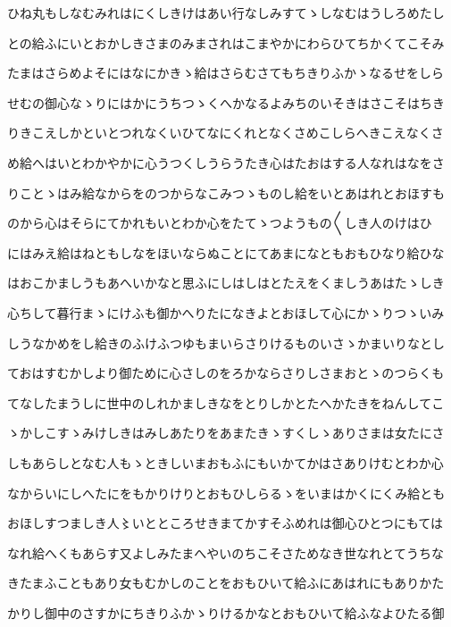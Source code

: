 \documentclass[a4paper,11pt,landscape]{ltjtarticle}
\begin{document}
\par\medskip
ひね丸もしなむみれはにくしきけはあい行なしみすてゝしなむはうしろめたし
\par\medskip
との給ふにいとおかしきさまのみまされはこまやかにわらひてちかくてこそみ
\par\medskip
たまはさらめよそにはなにかきゝ給はさらむさてもちきりふかゝなるせをしら
\par\medskip
せむの御心なゝりにはかにうちつゝくへかなるよみちのいそきはさこそはちき
\par\medskip
りきこえしかといとつれなくいひてなにくれとなくさめこしらへきこえなくさ
\par\medskip
め給へはいとわかやかに心うつくしうらうたき心はたおはする人なれはなをさ
\par\medskip
りことゝはみ給なからをのつからなこみつゝものし給をいとあはれとおほすも
\par\medskip
のから心はそらにてかれもいとわか心をたてゝつようもの〱しき人のけはひ
\par\medskip
にはみえ給はねともしなをほいならぬことにてあまになともおもひなり給ひな
\par\medskip
はおこかましうもあへいかなと思ふにしはしはとたえをくましうあはたゝしき
\par\medskip
心ちして暮行まゝにけふも御かへりたになきよとおほして心にかゝりつゝいみ
\par\medskip
しうなかめをし給きのふけふつゆもまいらさりけるものいさゝかまいりなとし
\par\medskip
ておはすむかしより御ために心さしのをろかならさりしさまおとゝのつらくも
\par\medskip
てなしたまうしに世中のしれかましきなをとりしかとたへかたきをねんしてこ
\par\medskip
ゝかしこすゝみけしきはみしあたりをあまたきゝすくしゝありさまは女たにさ
\par\medskip
しもあらしとなむ人もゝときしいまおもふにもいかてかはさありけむとわか心
\par\medskip
なからいにしへたにをもかりけりとおもひしらるゝをいまはかくにくみ給とも
\par\medskip
おほしすつましき人〻いとところせきまてかすそふめれは御心ひとつにもては
\par\medskip
なれ給へくもあらす又よしみたまへやいのちこそさためなき世なれとてうちな
\par\medskip
きたまふこともあり女もむかしのことをおもひいて給ふにあはれにもありかた
\par\medskip
かりし御中のさすかにちきりふかゝりけるかなとおもひいて給ふなよひたる御
\end{document}
